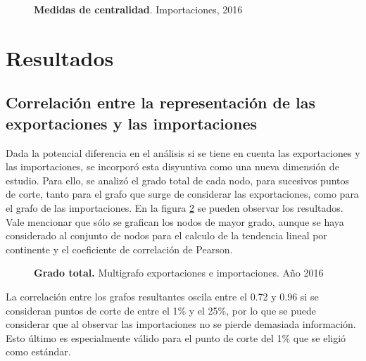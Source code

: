 \documentclass[class=article, crop=false]{standalone}
\begin{document}
\begin{figure}
\centering
{}

\caption{\textbf{Medidas de centralidad}. Importaciones, 2016}
\label{fig:centralidad_2016}
\end{figure}




\section{Resultados}


\subsection{Correlación entre la representación de las exportaciones y las importaciones}

Dada la potencial diferencia en el análisis si se tiene en cuenta las exportaciones y las importaciones, se incorporó esta disyuntiva como una nueva dimensión de estudio. Para ello, se analizó el grado total de cada nodo, para sucesivos puntos de corte, tanto para el grafo que surge de considerar las exportaciones, como para el grafo de las importaciones. En la figura \ref{fig:corr} se pueden observar los resultados. Vale mencionar que sólo se grafican los nodos de mayor grado, aunque se haya considerado al conjunto de nodos para el calculo de la tendencia lineal por continente y el coeficiente de correlación de Pearson.


\begin{figure}
\centering
{}
\caption{\textbf{Grado total.} Multigrafo exportaciones e importaciones. Año 2016}
\label{fig:corr}
\end{figure}


La correlación entre los grafos resultantes oscila entre el 0.72 y 0.96 si se consideran puntos de corte de entre el 1\% y el 25\%, por lo que se puede considerar que al observar las importaciones no se pierde demasiada información. Esto último es especialmente válido para el punto de corte del 1\% que se eligió como estándar. 
\end{document}
